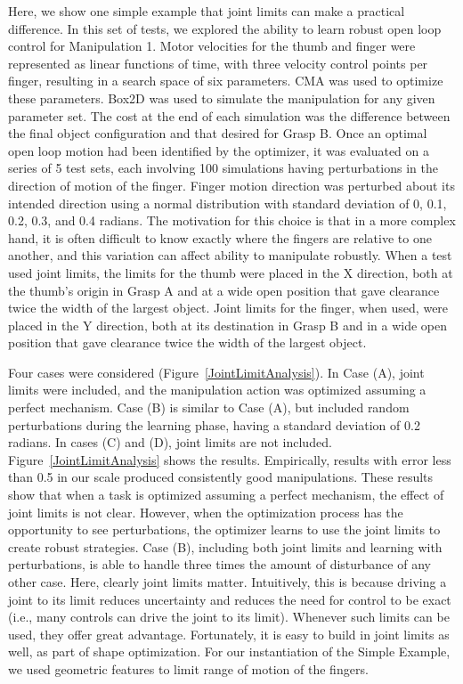 Here, we show one simple example that joint limits can make a practical difference.   In this set of tests, we explored the ability to learn robust open loop control for Manipulation 1.    Motor velocities for the thumb and finger were represented as linear functions of time, with three velocity control points per finger, resulting in a search space of six parameters.   CMA was used to optimize these parameters.    Box2D \cite{catto2011box2d} was used to simulate the manipulation for any given parameter set.   The cost at the end of each simulation was the difference between the final object configuration and that desired for Grasp B.     Once an optimal open loop motion had been identified by the optimizer, it was evaluated on a series of 5 test sets, each involving 100 simulations having perturbations in the direction of motion of the finger.    Finger motion direction was perturbed about its intended direction using a normal distribution with standard deviation of 0, 0.1, 0.2, 0.3, and 0.4 radians.    The motivation for this choice is that in a more complex hand, it is often difficult to know exactly where the fingers are relative to one another, and this variation can affect ability to manipulate robustly.   When a test used joint limits, the limits for the thumb were placed in the X direction, both at the thumb's origin in Grasp A and at a wide open position that gave clearance twice the width of the largest object.   Joint limits for the finger, when used, were placed in the Y direction, both at its destination in Grasp B and in a wide open position that gave clearance twice the width of the largest object.

Four cases were considered (Figure~\ref{JointLimitAnalysis}).   In Case (A), joint limits were included, and the manipulation action was optimized assuming a perfect mechanism.   Case (B) is similar to Case (A), but included random perturbations during the learning phase, having a standard deviation of 0.2 radians.    In cases (C) and (D), joint limits are not included.   Figure~\ref{JointLimitAnalysis} shows the results.   Empirically, results with error less than 0.5 in our scale produced consistently good manipulations.   These results show that when a task is optimized assuming a perfect mechanism, the effect of joint limits is not clear.    However, when the optimization process has the opportunity to see perturbations, the optimizer learns to use the joint limits to create robust strategies.    Case (B), including both joint limits and learning with perturbations, is able to handle three times the amount of disturbance of any other case.      Here, clearly joint limits matter.  Intuitively, this is because driving a joint to its limit reduces uncertainty and reduces the need for control to be exact (i.e., many controls can drive the joint to its limit).   Whenever such limits can be used, they offer great advantage.   Fortunately, it is easy to build in joint limits as well, as part of shape optimization.   For our instantiation of the Simple Example, we used geometric features to limit range of motion of the fingers.

